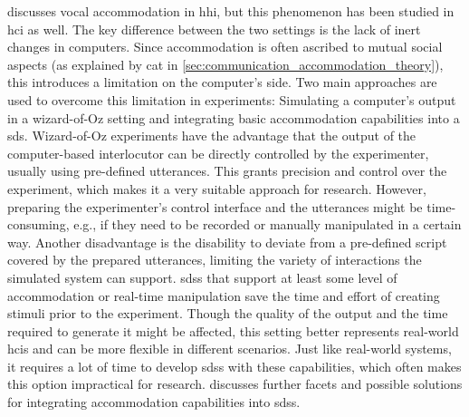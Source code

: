  discusses vocal accommodation in \ac{hhi}, but this phenomenon has been studied in \ac{hci} as well.
The key difference between the two settings is the lack of inert changes in computers.
Since accommodation is often ascribed to mutual social aspects (as explained by \ac{cat} in \cref{sec:communication_accommodation_theory}), this introduces a limitation on the computer's side.
Two main approaches are used to overcome this limitation in experiments:
Simulating a computer's output in a wizard-of-Oz setting and integrating basic accommodation capabilities into a \ac{sds}.
Wizard-of-Oz experiments have the advantage that the output of the computer-based interlocutor can be directly controlled by the experimenter, usually using pre-defined utterances.
This grants precision and control over the experiment, which makes it a very suitable approach for research.
However, preparing the experimenter's control interface and the utterances might be time-consuming, e.g., if they need to be recorded or manually manipulated in a certain way.
Another disadvantage is the disability to deviate from a pre-defined script covered by the prepared utterances, limiting the variety of interactions the simulated system can support.
\Acp{sds} that support at least some level of accommodation or real-time manipulation save the time and effort of creating stimuli prior to the experiment.
Though the quality of the output and the time required to generate it might be affected, this setting better represents real-world \acp{hci} and can be more flexible in different scenarios.
Just like real-world systems, it requires a lot of time to develop \acp{sds} with these capabilities, which often makes this option impractical for research.
 discusses further facets and possible solutions for integrating accommodation capabilities into \acp{sds}.

